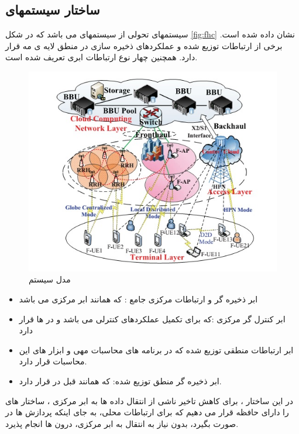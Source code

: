 \subsection{ساختار سیستمهای   }
 سیستمهای  تحولی از سیستمهای  می باشد که در شکل \eqref{fig:fhc} نشان داده شده است. برخی از ارتباطات توزیع شده و عملکردهای ذخیره سازی در منطق لایه ی مه قرار دارد. همچنین چهار نوع ارتباطات ابری تعریف شده است.
  \begin{figure}
  \centering
    \includegraphics[scale =0.7]{./pic1/fr}
  \caption{ مدل سیستم  \cite{fogComputing} }
  \label{fig:fr}
\end{figure}
 \begin{itemize}
 \item
 ابر ذخیره گر و ارتباطات مرکزی جامع :
 که همانند ابر مرکزی  می باشد
 \item
 ابر کنترل گر مرکزی :که برای تکمیل عملکردهای کنترلی  می باشد و در  ها قرار دارد
 \item
 ابر ارتباطات منطقی توزیع شده که در برنامه های محاسبات مهی و ابزار های این محاسبات قرار دارد.
 \item
  ابر ذخیره گر منطق توزیع شده:
  که همانند قبل در  قرار دارد.
 \end{itemize}
 در این ساختار ، برای کاهش تاخیر ناشی از انتقال داده ها به ابر مرکزی ، ساختار های  را دارای حافظه قرار می دهیم که برای ارتباطات محلی، به جای اینکه پردازش ها در  صورت بگیرد، بدون نیاز به انتقال به ابر مرکزی، درون  ها انجام پذیرد. 
